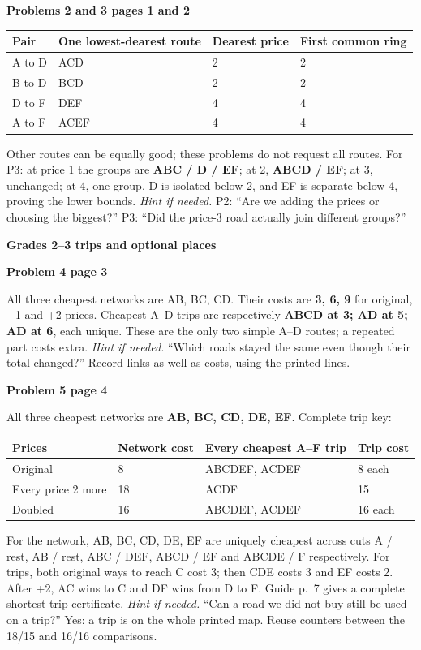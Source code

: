 \documentclass[11pt]{article}
\newcommand{\head}[1]{\par{\large\bfseries #1}\par}
\newcommand{\sub}[1]{\par\textbf{#1}\par}
\newcommand{\hint}[1]{\textit{Hint if needed.} #1}
\begin{document}
\sub{Problems 2 and 3 pages 1 and 2}
\begin{center}\small
\begin{tabular}{llll}
Pair & One lowest-dearest route & Dearest price & First common ring\\\midrule
A to D & ACD & 2 & 2\\
B to D & BCD & 2 & 2\\
D to F & DEF & 4 & 4\\
A to F & ACEF & 4 & 4
\end{tabular}
\end{center}
Other routes can be equally good; these problems do not request all routes. For P3: at price 1 the groups are \textbf{ABC / D / EF}; at 2, \textbf{ABCD / EF}; at 3, unchanged; at 4, one group. D is isolated below 2, and EF is separate below 4, proving the lower bounds. \hint{P2: ``Are we adding the prices or choosing the biggest?'' P3: ``Did the price-3 road actually join different groups?''}

\newpage
\head{Grades 2--3 trips and optional places}
\sub{Problem 4 page 3}
All three cheapest networks are AB, BC, CD. Their costs are \textbf{3, 6, 9} for original, +1 and +2 prices. Cheapest A--D trips are respectively \textbf{ABCD at 3; AD at 5; AD at 6}, each unique. These are the only two simple A--D routes; a repeated part costs extra. \hint{``Which roads stayed the same even though their total changed?''} Record links as well as costs, using the printed lines.

\sub{Problem 5 page 4}
All three cheapest networks are \textbf{AB, BC, CD, DE, EF}. Complete trip key:
\begin{center}\small
\begin{tabular}{llll}
Prices & Network cost & Every cheapest A--F trip & Trip cost\\\midrule
Original & 8 & ABCDEF, ACDEF & 8 each\\
Every price 2 more & 18 & ACDF & 15\\
Doubled & 16 & ABCDEF, ACDEF & 16 each
\end{tabular}
\end{center}
For the network, AB, BC, CD, DE, EF are uniquely cheapest across cuts A / rest, AB / rest, ABC / DEF, ABCD / EF and ABCDE / F respectively. For trips, both original ways to reach C cost 3; then CDE costs 3 and EF costs 2. After +2, AC wins to C and DF wins from D to F. Guide p.~7 gives a complete shortest-trip certificate. \hint{``Can a road we did not buy still be used on a trip?''} Yes: a trip is on the whole printed map. Reuse counters between the 18/15 and 16/16 comparisons.
\end{document}
